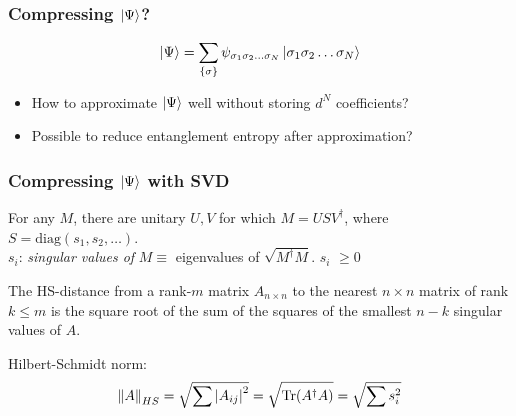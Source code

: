\documentclass{beamer}
\theoremstyle{definition}
\begin{document}
\begin{frame}
	\frametitle{Compressing $\ket{\Psi}$?}
	\begin{align*}
		\ket{\Psi} = \sum_{\{ \sigma \}} \psi_{\sigma_1\sigma_2\dots \sigma_N} \ket{\sigma_1\sigma_2\dots \sigma_N}
	\end{align*}

	\vspace{10pt}
	
	
	\begin{itemize}
		\item \pause How to approximate $\ket{\Psi}$ well without storing $d^N$ coefficients?
		
		\vspace{10pt}
		\item \pause Possible to reduce entanglement entropy after approximation?
	\end{itemize}
\end{frame}


\begin{frame}
	\frametitle{Compressing $\ket{\Psi}$ with SVD}
	
	\begin{theorem}
		For any $M$, there are unitary $U,V$ for which  $M = U S V^\dagger$, where $S = \text{diag}(s_1,s_2,\dots)$.\\
		\vspace{5pt}
		$s_i$: \textit{singular values of} $M \equiv$  eigenvalues of $\sqrt{M^\dagger M }$. $s_i$ $\geq 0$
	\end{theorem}
	
	
	\begin{theorem}
		The HS-distance from a rank-$m$ matrix $A_{n\times n}$ to the nearest $n\times n$ matrix of rank $k \leq m$  is the square root of the sum of the squares of the smallest $n-k$ singular values of $A$.
	\end{theorem}

	Hilbert-Schmidt norm:
	\begin{align*}
		\norm{A}_{HS} = \sqrt{\sum \abs{A_{ij}}^2} =  \sqrt{\Tr(A^\dagger A)} = \sqrt{\sum s_i^2}
	\end{align*} 
	
\end{frame}
\end{document}
